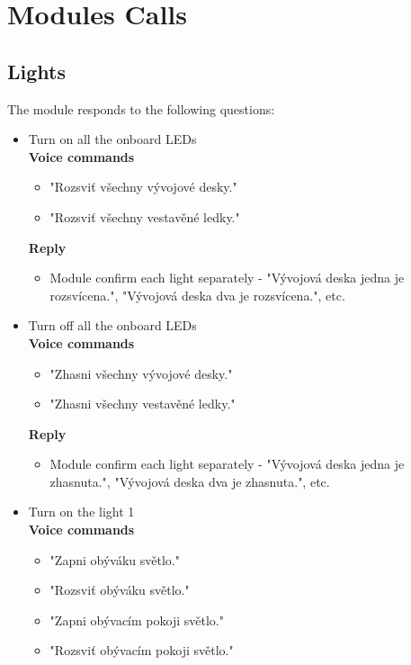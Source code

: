 \chapter{Modules Calls} \label{app:modules_calls}

\section{Lights} \label{section:app_lights}
The module responds to the following questions:
\begin{itemize}
    \item Turn on all the onboard LEDs\\
    \textbf{Voice commands}
    \begin{itemize}
        \item "Rozsviť všechny vývojové desky."
        \item "Rozsviť všechny vestavěné ledky."
    \end{itemize}
    \textbf{Reply}
    \begin{itemize}
        \item Module confirm each light separately - "Vývojová deska jedna je rozsvícena.", "Vývojová deska dva je rozsvícena.", etc.
    \end{itemize}
    \item Turn off all the onboard LEDs\\
    \textbf{Voice commands}
    \begin{itemize}
        \item "Zhasni všechny vývojové desky."
        \item "Zhasni všechny vestavěné ledky."
    \end{itemize}
    \textbf{Reply}
    \begin{itemize}
        \item Module confirm each light separately - "Vývojová deska jedna je zhasnuta.", "Vývojová deska dva je zhasnuta.", etc.
    \end{itemize}    
    \item Turn on the light 1\\
    \textbf{Voice commands}
    \begin{itemize}
        \item "Zapni obýváku světlo."
        \item "Rozsviť obýváku světlo."
        \item "Zapni obývacím pokoji světlo."
        \item "Rozsviť obývacím pokoji světlo."

\end{itemize}
\end{itemize}
